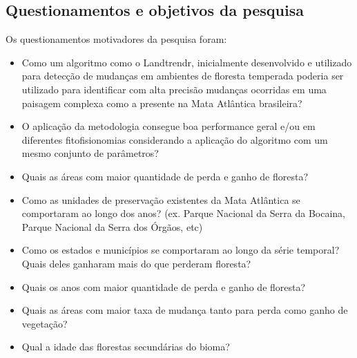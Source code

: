 \documentclass[12pt,a4paper]{article}
\begin{document}


\subsection{Questionamentos e objetivos da pesquisa}
Os questionamentos motivadores da pesquisa foram:
\begin{itemize}
    \item Como um algoritmo como o Landtrendr, inicialmente desenvolvido e utilizado para detecção de mudanças em ambientes de floresta temperada poderia ser utilizado para identificar com alta precisão mudanças ocorridas em uma paisagem complexa como a presente na Mata Atlântica brasileira?
    
    \item O aplicação da metodologia consegue boa performance geral e/ou em diferentes fitofisionomias considerando a aplicação do algoritmo com um mesmo conjunto de parâmetros?
    
    \item Quais as áreas com maior quantidade de perda e ganho de floresta?
    
    \item Como as unidades de preservação existentes da Mata Atlântica se comportaram ao longo dos anos? (ex. Parque Nacional da Serra da Bocaina, Parque Nacional da Serra dos Órgãos, etc)
    
    \item Como os estados e municípios se comportaram ao longo da série temporal? Quais deles ganharam mais do que perderam floresta?
    
    \item Quais os anos com maior quantidade de perda e ganho de floresta?
    
    \item Quais as áreas com maior taxa de mudança tanto para perda como ganho de vegetação? 
    
    \item Qual a idade das florestas secundárias do bioma? 
\end{itemize}
\end{document}
